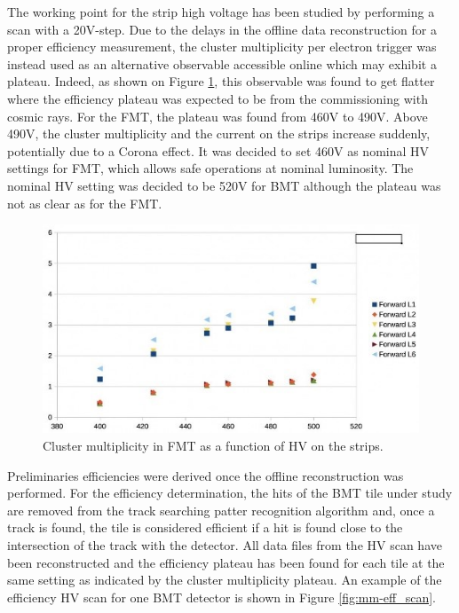 The working point for the strip high voltage has been studied by performing a scan with a 20V-step. Due to the delays in the offline data reconstruction for a proper efficiency measurement, the cluster multiplicity per electron trigger was instead used as an alternative observable accessible online which may exhibit a plateau. 
Indeed, as shown on Figure \ref{fig:mm-fig15}, this observable was found to get flatter where the efficiency plateau was expected to be from the commissioning with cosmic rays.  For the FMT, the plateau was found from 460V to 490V. Above 490V, the cluster multiplicity and the current on the strips increase suddenly, potentially due to a Corona effect. It was decided to set 460V as nominal HV settings for FMT, which allows safe operations at nominal luminosity. The nominal HV setting was decided to be 520V for BMT although the plateau was not as clear as for the FMT.  

\begin{figure}[htb]
 \includegraphics[width=1.0\columnwidth,keepaspectratio]{images/Plateau_cluster_FMT.jpg}
 \caption{Cluster multiplicity in FMT as a function of HV on the strips.}
 \label{fig:mm-fig15}
\end{figure}

Preliminaries efficiencies were derived once the offline reconstruction was performed. For the efficiency determination, the hits of the BMT tile under study are removed from the track searching patter recognition algorithm and, once a track is found, the tile is considered efficient if a hit is found close to the intersection of the track with the detector. All data files from the HV scan have been reconstructed and the efficiency plateau has been found for each tile at the same setting as indicated by the cluster multiplicity plateau. An example of the efficiency HV scan for one BMT detector is shown in Figure \ref{fig:mm-eff_scan}.

